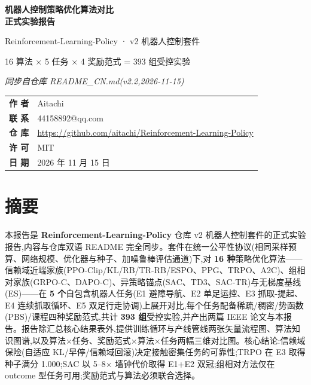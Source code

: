 \documentclass[11pt,a4paper]{ctexart}
\begin{document}
\begin{titlepage}
\centering
\vspace*{2.2cm}
{\Huge\bfseries 机器人控制策略优化算法对比\\[0.5em] 正式实验报告\par}
\vspace{0.9cm}
{\Large Reinforcement-Learning-Policy · v2 机器人控制套件\par}
\vspace{0.5cm}
{\large 16 算法 $\times$ 5 任务 $\times$ 4 奖励范式 = 393 组受控实验\par}
\vspace{2.2cm}
{\large\itshape 同步自仓库 README\_CN.md(v2.2,2026-11-15)\par}
\vspace{2.6cm}
\begin{tabular}{rl}
\textbf{作 者} & Aitachi\\
\textbf{联 系} & 44158892@qq.com\\
\textbf{仓 库} & \url{https://github.com/aitachi/Reinforcement-Learning-Policy}\\
\textbf{许 可} & MIT\\
\textbf{日 期} & 2026 年 11 月 15 日\\
\end{tabular}
\vfill
\end{titlepage}

\tableofcontents
\newpage

\section*{摘要}
本报告是 \textbf{Reinforcement-Learning-Policy} 仓库 v2 机器人控制套件的正式实验报告,内容与仓库双语 README 完全同步。套件在统一公平性协议(相同采样预算、网络规模、优化器与种子、加噪鲁棒评估通道)下,对 \textbf{16 种}策略优化算法——信赖域近端家族(PPO-Clip/KL/RB/TR-RB/ESPO、PPG、TRPO、A2C)、组相对家族(GRPO-C、DAPO-C)、异策略锚点(SAC、TD3、SAC-TR)与无梯度基线(ES)——在 \textbf{5 个}自包含机器人任务(E1 避障导航、E2 单足运控、E3 抓取-提起、E4 连续抓取循环、E5 双足行走协调)上展开对比,每个任务配备稀疏/稠密/势函数(PBS)/课程四种奖励范式,共计 \textbf{393 组}受控实验,并产出两篇 IEEE 论文与本报告。报告除汇总核心结果表外,提供训练循环与产线管线两张矢量流程图、算法知识图谱,以及算法$\times$任务、奖励范式$\times$算法$\times$任务两幅三维对比图。核心结论:信赖域保险(自适应 KL/早停/信赖域回滚)决定接触密集任务的可靠性;TRPO 在 E3 取得种子满分 1.000;SAC 以 5--8$\times$ 墙钟代价取得 E1+E2 双冠;组相对方法仅在 outcome 型任务可用;奖励范式与算法必须联合选择。
\end{document}
